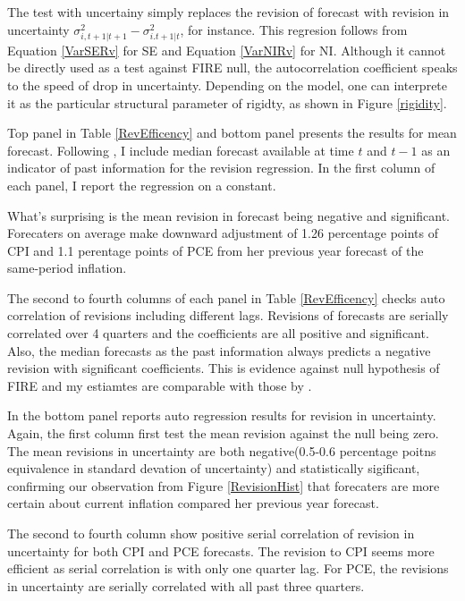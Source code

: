 \documentclass[]{article}
\begin{document}
The test with uncertainy simply replaces the revision of forecast with revision in uncertainty $\sigma^2_{i,t+1|t+1} - \sigma^2_{i.t+1|t}$, for instance. This regresion follows from Equation \ref{VarSERv} for SE and Equation \ref{VarNIRv} for NI. Although it  cannot be directly used as a test against FIRE null, the autocorrelation coefficient speaks to the speed of drop in uncertainty. Depending on the model, one can interprete it as the particular structural parameter of rigidty, as shown in Figure \ref{rigidity}. 

Top panel in Table \ref{RevEfficency} and bottom panel presents the results for mean forecast. Following \citet{fuhrer2018intrinsic}, I include median forecast available at time $t$ and $t-1$ as an indicator of past information for the revision regression. In the first column of each panel, I report the regression on a constant. 

What's surprising is the mean revision in forecast being negative and significant. Forecaters on average make downward adjustment of 1.26 percentage points of CPI and  1.1 perentage points of PCE from her previous year forecast of the same-period inflation. 

The second to fourth columns of each panel in Table \ref{RevEfficency} checks auto correlation of revisions including different lags. Revisions of forecasts are serially correlated over 4 quarters and the coefficients are all positive and significant. Also, the median forecasts as the past information always predicts a negative revision with significant coefficients. This is evidence against null hypothesis of FIRE and my estiamtes are comparable with those by \citet{fuhrer2018intrinsic}. 

In the bottom panel reports auto regression results for revision in uncertainty. Again, the first column first test the mean revision against the null being zero. The mean revisions in uncertainty are both negative(0.5-0.6 percentage poitns equivalence in standard devation of uncertainty) and statistically sigificant, confirming our observation from Figure \ref{RevisionHist} that forecaters are more certain about current inflation compared her previous year forecast. 

The second to fourth column show positive serial correlation of revision in uncertainty for both CPI and PCE forecasts. The revision to CPI seems more efficient as serial correlation is with only one quarter lag. For PCE, the revisions in uncertainty are serially correlated with all past three quarters. 
\end{document}
